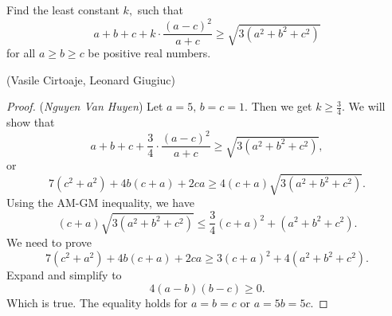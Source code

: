 \documentclass[12pt,a4paper]{book}
\begin{document}
\begin{pro_no_count}
Find the least constant $k,$ such that
$$a+b+c+k\cdot\frac{(a-c)^2}{a+c}\geq \sqrt{3(a^2+b^2+c^2)}$$
for all $a\ge b\ge c$ be positive real numbers.
\begin{flushright}(Vasile Cirtoaje, Leonard Giugiuc)\end{flushright}
\end{pro_no_count}

\begin{proof} (\textit{Nguyen Van Huyen}) Let $a=5,\,b=c=1.$ Then we get $k \geqslant \frac34.$ We will show that
$$a+b+c+\frac34\cdot\frac{\left(a-c\right)^2}{a+c}\geq\sqrt{3\left(a^2+b^2+c^2\right)},$$
or
\[7(c^2+a^2)+4b(c+a)+2ca \geqslant 4(c+a)\sqrt{3(a^2+b^2+c^2)}.\]
Using the AM-GM inequality, we have
\[(c+a)\sqrt{3(a^2+b^2+c^2)} \leqslant \frac34(c+a)^2+(a^2+b^2+c^2).\]
We need to prove
\[7(c^2+a^2)+4b(c+a)+2ca \geqslant 3(c+a)^2 + 4(a^2+b^2+c^2).\]
Expand and simplify to
\[4(a-b)(b-c) \geqslant 0.\]
Which is true. The equality holds for $a=b=c$ or $a=5b=5c.$
\end{proof}
\end{document}
